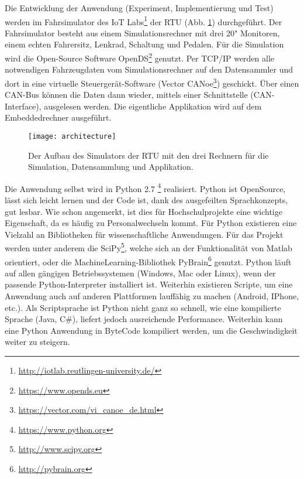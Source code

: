 \label{chap:infrastructure}
Die Entwicklung der Anwendung (Experiment, Implementierung und Test) werden im Fahrsimulator des IoT Labs\footnote{\url{http://iotlab.reutlingen-university.de/}} der \acl{RTU} (Abb. \ref{fig:architecure}) durchgeführt. 
Der Fahrsimulator besteht aus einem Simulationsrechner mit drei 20" Monitoren, einem echten Fahrersitz, Lenkrad, Schaltung und Pedalen. Für die Simulation wird die Open-Source Software OpenDS\footnote{\url{https://www.opends.eu}} genutzt. Per TCP/IP werden alle notwendigen Fahrzeugdaten vom Simulationsrechner auf den Datensammler und dort in eine virtuelle Steuergerät-Software (Vector CANoe\footnote{\url{https://vector.com/vi_canoe_de.html}}) geschickt. Über einen CAN-Bus können die Daten dann wieder, mittels einer Schnittstelle (CAN-Interface), ausgelesen werden. Die eigentliche Applikation wird auf dem Embeddedrechner ausgeführt.

\begin{figure}[h] 
  \begin{center}
    \texttt{[image: architecture]}
    \caption[Aufbau des Simulators]{Der Aufbau des Simulators der \acl{RTU} mit den drei Rechnern für die Simulation, Datensammlung und Applikation. \label{fig:architecure}}
  \end{center}
\end{figure}

Die Anwendung selbst wird in Python 2.7 \footnote{\url{https://www.python.org}} realisiert. Python ist OpenSource, lässt sich leicht lernen und der Code ist, dank des ausgefeilten Sprachkonzepts, gut lesbar. Wie schon angemerkt, ist dies für Hochschulprojekte eine wichtige Eigenschaft, da es häufig zu Personalwechseln kommt. Für Python existieren eine Vielzahl an Bibliotheken für wissenschaftliche Anwendungen. Für das Projekt werden unter anderem die SciPy\footnote{\url{http://www.scipy.org}}, welche sich an der Funktionalität von Matlab orientiert,  oder die MachineLearning-Bibliothek PyBrain\footnote{\url{http://pybrain.org}} genutzt. Python läuft auf allen gängigen Betriebssystemen (Windows, Mac oder Linux), wenn der passende Python-Interpreter installiert ist. Weiterhin existieren Scripte, um eine Anwendung auch auf anderen Plattformen lauffähig zu machen (Android, IPhone, etc.). Als Scriptsprache ist Python nicht ganz so schnell, wie eine kompilierte Sprache (Java, C\#), liefert jedoch ausreichende Performance. Weiterhin kann eine Python Anwendung in ByteCode kompiliert werden, um die Geschwindigkeit weiter zu steigern. 

